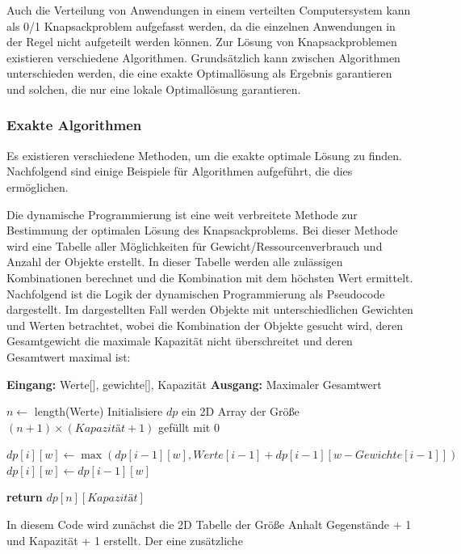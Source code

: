 Auch die Verteilung von Anwendungen in einem verteilten Computersystem kann als 0/1 Knapsackproblem aufgefasst werden, da die einzelnen Anwendungen in der Regel nicht aufgeteilt werden können. Zur Lösung von Knapsackproblemen existieren verschiedene Algorithmen. Grundsätzlich kann zwischen Algorithmen unterschieden werden, die eine exakte Optimallösung als Ergebnis garantieren und solchen, die nur eine lokale Optimallösung garantieren. 

\subsubsection{Exakte Algorithmen}

Es existieren verschiedene Methoden, um die exakte optimale Lösung zu finden. Nachfolgend sind einige Beispiele für Algorithmen aufgeführt, die dies ermöglichen. 

Die dynamische Programmierung ist eine weit verbreitete Methode zur Bestimmung der optimalen Lösung des Knapsackproblems. Bei dieser Methode wird eine Tabelle aller Möglichkeiten für Gewicht/Ressourcenverbrauch und Anzahl der Objekte erstellt. In dieser Tabelle werden alle zulässigen Kombinationen berechnet und die Kombination mit dem höchsten Wert ermittelt. Nachfolgend ist die Logik der dynamischen Programmierung als Pseudocode dargestellt. Im dargestellten Fall werden Objekte mit unterschiedlichen Gewichten und Werten betrachtet, wobei die Kombination der Objekte gesucht wird, deren Gesamtgewicht die maximale Kapazität nicht überschreitet und deren Gesamtwert maximal ist:

\begin{algorithmic}
    \State  \textbf{Eingang:} Werte[], gewichte[], Kapazität
    \State  \textbf{Ausgang:} Maximaler Gesamtwert
    
    \State  $n \leftarrow$ length(Werte)
    \State  Initialisiere $dp$ ein 2D Array der Größe $(n+1) \times (Kapazität+1)$ gefüllt mit 0
    
                \State $dp[i][w] \leftarrow \max(dp[i-1][w], Werte[i-1] + dp[i-1][w - Gewichte[i-1]])$
            \Else
                \State  $dp[i][w] \leftarrow dp[i-1][w]$
            \EndIf
        \EndFor
    \EndFor
    
    \State  \textbf{return} $dp[n][Kapazität]$
\end{algorithmic}

In diesem Code wird zunächst die 2D Tabelle der Größe Anhalt Gegenstände + 1 und Kapazität + 1 erstellt. Der eine zusätzliche 

